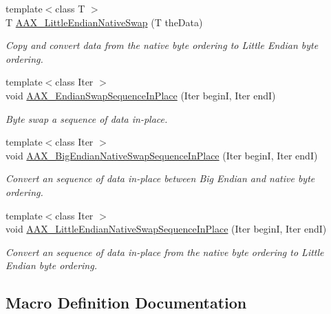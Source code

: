 \begin{DoxyCompactItemize}
{\footnotesize template$<$class T $>$ }\\T \mbox{\hyperlink{a00488_a49f57c502ff278b26260b1744da99633}{A\+A\+X\+\_\+\+Little\+Endian\+Native\+Swap}} (T the\+Data)
\begin{DoxyCompactList}\small\item\em Copy and convert data from the native byte ordering to Little Endian byte ordering. \end{DoxyCompactList}\item 
{\footnotesize template$<$class Iter $>$ }\\void \mbox{\hyperlink{a00488_ae58f8ce3c8247e07d49e17c011ec5366}{A\+A\+X\+\_\+\+Endian\+Swap\+Sequence\+In\+Place}} (Iter beginI, Iter endI)
\begin{DoxyCompactList}\small\item\em Byte swap a sequence of data in-\/place. \end{DoxyCompactList}\item 
{\footnotesize template$<$class Iter $>$ }\\void \mbox{\hyperlink{a00488_ae9e72785a26249cd3e3c05baf8c9ce70}{A\+A\+X\+\_\+\+Big\+Endian\+Native\+Swap\+Sequence\+In\+Place}} (Iter beginI, Iter endI)
\begin{DoxyCompactList}\small\item\em Convert an sequence of data in-\/place between Big Endian and native byte ordering. \end{DoxyCompactList}\item 
{\footnotesize template$<$class Iter $>$ }\\void \mbox{\hyperlink{a00488_a4d8bcdfb048c8124f1f2886537e65678}{A\+A\+X\+\_\+\+Little\+Endian\+Native\+Swap\+Sequence\+In\+Place}} (Iter beginI, Iter endI)
\begin{DoxyCompactList}\small\item\em Convert an sequence of data in-\/place from the native byte ordering to Little Endian byte ordering. \end{DoxyCompactList}\end{DoxyCompactItemize}


\subsection{Macro Definition Documentation}
\mbox{\label{a00488_a8bad80e5aaa9c0a227bf53589dfa181b}} 
